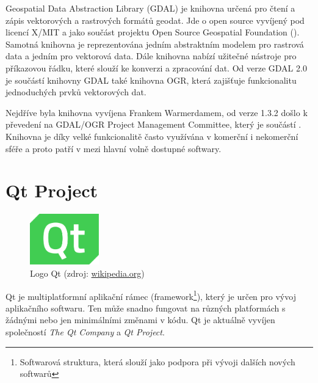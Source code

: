 Geospatial Data Abstraction Library (GDAL) je knihovna určená pro čtení
a zápis vektorových a rastrových formátů geodat. Jde o open source
vyvíjený pod licencí X/MIT a jako součást projektu Open Source
Geospatial Foundation (). Samotná knihovna je reprezentována
jedním abstraktním modelem pro rastrová data a jedním pro vektorová
data. Dále knihovna nabízí užitečné nástroje pro příkazovou řádku,
které slouží ke konverzi a zpracování dat. Od verze GDAL 2.0 je
součástí knihovny GDAL také knihovna OGR, která zajišťuje
funkcionalitu jednoduchých prvků vektorových dat.

Nejdříve byla knihovna vyvíjena Frankem Warmerdamem, od verze 1.3.2
došlo k převedení na GDAL/OGR Project Management Committee, který je
součástí . Knihovna je díky velké funkcionalitě často
využívána v komerční i nekomerční sféře a proto patří v  mezi
hlavní volně dostupné softwary. \cite{gdal, gdal_wiki}

\section{Qt Project}

\begin{figure}[H]
	 \centering
      \includegraphics[width=3cm]{./pictures/qt-logo.png}
      \caption{Logo Qt (zdroj:
\href{https://upload.wikimedia.org/wikipedia/commons/thumb/0/0b/Qt_logo_2016.svg/578px-Qt_logo_2016.svg.png}{wikipedia.org})}
      \label{fig:qt}
  \end{figure}

Qt je multiplatformní aplikační rámec (framework\footnote{Softwarová
  struktura, která slouží jako podpora při vývoji dalších nových
  softwarů}), který je určen pro vývoj aplikačního softwaru. Ten může
snadno fungovat na různých platformách s žádnými nebo jen minimálními
změnami v kódu. Qt je aktuálně vyvíjen společností \textit{The Qt
  Company} a \textit{Qt Project}.\cite{qt_wiki, qt}



